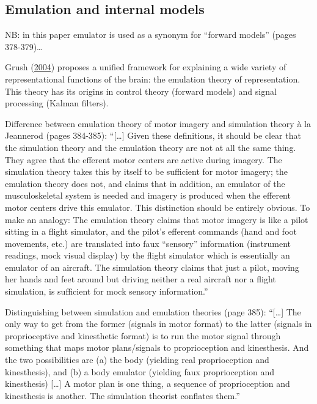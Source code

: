 \documentclass[a4paper,12pt,twoside,openright,oldfontcommands]{memoir}
\begin{document}
\subsection{Emulation and internal
models}\label{emulation-and-internal-models}

NB: in this paper emulator is used as a synonym for ``forward models''
(pages 378-379)\ldots{}

Grush (\protect\hyperlink{ref-grush_emulation_2004}{2004}) proposes a
unified framework for explaining a wide variety of representational
functions of the brain: the emulation theory of representation. This
theory has its origins in control theory (forward models) and signal
processing (Kalman filters).

Difference between emulation theory of motor imagery and simulation
theory à la Jeannerod (pages 384-385): ``{[}\ldots{}{]} Given these
definitions, it should be clear that the simulation theory and the
emulation theory are not at all the same thing. They agree that the
efferent motor centers are active during imagery. The simulation theory
takes this by itself to be sufficient for motor imagery; the emulation
theory does not, and claims that in addition, an emulator of the
musculoskeletal system is needed and imagery is produced when the
efferent motor centers drive this emulator. This distinction should be
entirely obvious. To make an analogy: The emulation theory claims that
motor imagery is like a pilot sitting in a flight simulator, and the
pilot's efferent commands (hand and foot movements, etc.) are translated
into faux ``sensory'' information (instrument readings, mock visual
display) by the flight simulator which is essentially an emulator of an
aircraft. The simulation theory claims that just a pilot, moving her
hands and feet around but driving neither a real aircraft nor a flight
simulation, is sufficient for mock sensory information.''

Distinguishing between simulation and emulation theories (page 385):
``{[}\ldots{}{]} The only way to get from the former (signals in motor
format) to the latter (signals in proprioceptive and kinesthetic format)
is to run the motor signal through something that maps motor
plans/signals to proprioception and kinesthesis. And the two
possibilities are (a) the body (yielding real proprioception and
kinesthesis), and (b) a body emulator (yielding faux proprioception and
kinesthesis) {[}\ldots{}{]} A motor plan is one thing, a sequence of
proprioception and kinesthesis is another. The simulation theorist
conflates them.''
\end{document}
